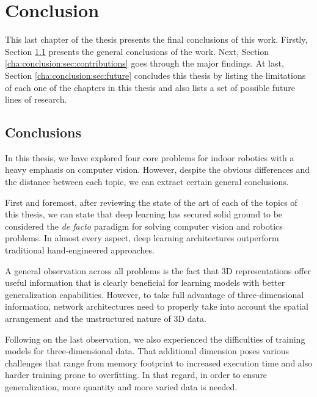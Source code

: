 \chapter{Conclusion}
\label{cha:conclusion}

\begin{chapterabstract}
This last chapter of the thesis presents the final conclusions of this work. Firstly, Section \ref{cha:conclusion:sec:findings} presents the general conclusions of the work. Next, Section \ref{cha:conclusion:sec:contributions} goes through the major findings. At last, Section \ref{cha:conclusion:sec:future} concludes this thesis by listing the limitations of each one of the chapters in this thesis and also lists a set of possible future lines of research.
\end{chapterabstract}

\minitoc

\clearpage

\section{Conclusions}
\label{cha:conclusion:sec:findings}

In this thesis, we have explored four core problems for indoor robotics with a heavy emphasis on computer vision. However, despite the obvious differences and the distance between each topic, we can extract certain general conclusions.

First and foremost, after reviewing the state of the art of each of the topics of this thesis, we can state that deep learning has secured solid ground to be considered the \emph{de facto} paradigm for solving computer vision and robotics problems. In almost every aspect, deep learning architectures outperform traditional hand-engineered approaches.

A general observation across all problems is the fact that \ac{3D} representations offer useful information that is clearly beneficial for learning models with better generalization capabilities. However, to take full advantage of three-dimensional information, network architectures need to properly take into account the spatial arrangement and the unstructured nature of \ac{3D} data.

Following on the last observation, we also experienced the difficulties of training models for three-dimensional data. That additional dimension poses various challenges that range from memory footprint to increased execution time and also harder training prone to overfitting. In that regard, in order to ensure generalization, more quantity and more varied data is needed.

